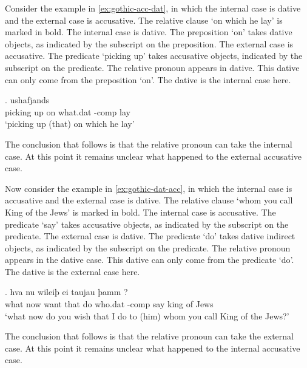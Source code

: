 Consider the example in \ref{ex:gothic-acc-dat}, in which the internal case is dative and the external case is accusative. The relative clause  `on which he lay' is marked in bold.
The internal case is dative. The preposition  `on' takes dative objects, as indicated by the subscript on the preposition.
The external case is accusative. The predicate  `picking up' takes accusative objects, indicated by the subscript on the predicate.
The relative pronoun  appears in dative. This dative can only come from the preposition  `on'. The dative is the internal case here.

\exg. ushafjands    \\
 {picking up}\scsub{[acc]} on\scsub{[dat]} what.\ac{dat} -\ac{comp} lay\\
 `picking up (that) on which he lay' \label{ex:gothic-acc-dat}

The conclusion that follows is that the relative pronoun can take the internal case. At this point it remains unclear what happened to the external accusative case.

Now consider the example in \ref{ex:gothic-dat-acc}, in which the internal case is accusative and the external case is dative. The relative clause  `whom you call King of the Jews' is marked in bold.
The internal case is accusative. The predicate  `say' takes accusative objects, as indicated by the subscript on the predicate.
The external case is dative. The predicate  `do' takes dative indirect objects, as indicated by the subscript on the predicate.
The relative pronoun  appears in the dative case. This dative can only come from the predicate  `do'. The dative is the external case here.

\exg. hva nu wileiþ ei taujau þamm    ?\\
 what now want that do\scsub{[dat]} who.\ac{dat} -\ac{comp} say\scsub{[acc]} king {of Jews}\\
 `what now do you wish that I do to (him) whom you call King of the Jews?' \label{ex:gothic-dat-acc}

The conclusion that follows is that the relative pronoun can take the external case. At this point it remains unclear what happened to the internal accusative case.

